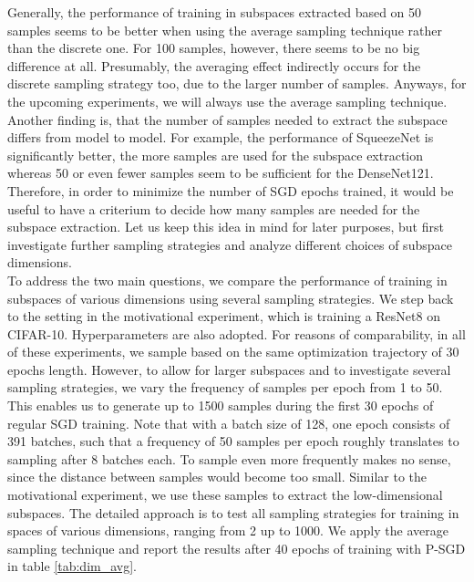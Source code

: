 \documentclass[11pt, a4paper]{article}
\begin{document}
Generally, the performance of training in subspaces extracted based on 50 samples seems to be better when using the average sampling technique rather than the discrete one. For 100 samples, however, there seems to be no big difference at all. Presumably, the averaging effect indirectly occurs for the discrete sampling strategy too, due to the larger number of samples. Anyways, for the upcoming experiments, we will always use the average sampling technique. Another finding is, that the number of samples needed to extract the subspace differs from model to model. For example, the performance of SqueezeNet is significantly better, the more samples are used for the subspace extraction whereas 50 or even fewer samples seem to be sufficient for the DenseNet121. Therefore, in order to minimize the number of SGD epochs trained, it would be useful to have a criterium to decide how many samples are needed for the subspace extraction. Let us keep this idea in mind for later purposes, but first investigate further sampling strategies and analyze different choices of subspace dimensions. \\

To address the two main questions, we compare the performance of training in subspaces of various dimensions using several sampling strategies. We step back to the setting in the motivational experiment, which is training a ResNet8 on CIFAR-10. Hyperparameters are also adopted. For reasons of comparability, in all of these experiments, we sample based on the same optimization trajectory of 30 epochs length. However, to allow for larger subspaces and to investigate several sampling strategies, we vary the frequency of samples per epoch from 1 to 50. This enables us to generate up to 1500 samples during the first 30 epochs of regular SGD training. Note that with a batch size of 128, one epoch consists of 391 batches, such that a frequency of 50 samples per epoch roughly translates to sampling after 8 batches each. To sample even more frequently makes no sense, since the distance between samples would become too small. Similar to the motivational experiment, we use these samples to extract the low-dimensional subspaces. The detailed approach is to test all sampling strategies for training in spaces of various dimensions, ranging from 2 up to 1000. We apply the average sampling technique and report the results after 40 epochs of training with P-SGD in table \ref{tab:dim_avg}.
\end{document}
